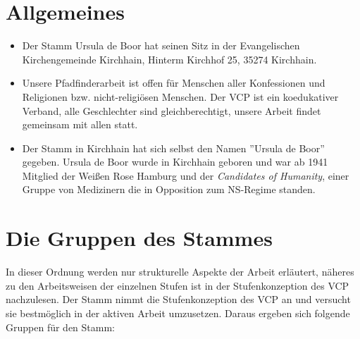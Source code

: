 \documentclass[a4paper]{article}
\newcommand{\name}{Ursula de Boor\xspace}
\begin{document}
\section{Allgemeines}
\begin{itemize}
    \item Der Stamm \name hat seinen Sitz in der Evangelischen Kirchengemeinde Kirchhain, Hinterm Kirchhof 25, 35274 Kirchhain.
    \item Unsere Pfadfinderarbeit ist offen für Menschen aller Konfessionen und Religionen bzw. nicht-religiösen Menschen. Der VCP ist ein koedukativer Verband, alle Geschlechter sind gleichberechtigt, unsere Arbeit findet gemeinsam mit allen statt.
    \item Der Stamm in Kirchhain hat sich selbst den Namen ''\name'' gegeben. \name wurde in Kirchhain geboren und war ab 1941 Mitglied der Weißen Rose Hamburg und der \textit{Candidates of Humanity}, einer Gruppe von Medizinern die in Opposition zum NS-Regime standen. 
\end{itemize}

\section{Die Gruppen des Stammes}
In dieser Ordnung werden nur strukturelle Aspekte der Arbeit erläutert, näheres zu den Arbeitsweisen der einzelnen Stufen ist in der Stufenkonzeption des VCP nachzulesen. Der Stamm nimmt die Stufenkonzeption des VCP an und versucht sie bestmöglich in der aktiven Arbeit umzusetzen. Daraus ergeben sich folgende Gruppen für den Stamm:
\end{document}
